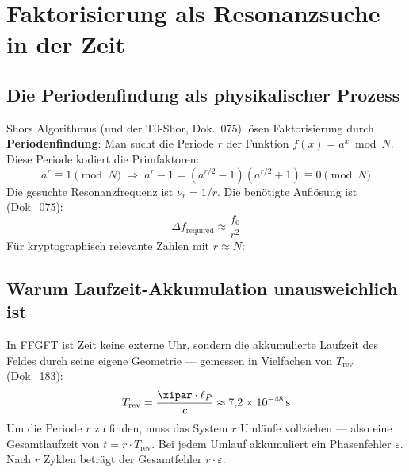 \section{Faktorisierung als Resonanzsuche in der Zeit}

\subsection{Die Periodenfindung als physikalischer Prozess}

Shors Algorithmus (und der T0-Shor, Dok.~075) lösen Faktorisierung durch
\textbf{Periodenfindung}: Man sucht die Periode $r$ der Funktion
$f(x) = a^x \bmod N$. Diese Periode kodiert die Primfaktoren:
\begin{equation}
    a^r \equiv 1 \pmod{N}
    \;\Rightarrow\;
    a^r - 1 = (a^{r/2} - 1)(a^{r/2} + 1) \equiv 0 \pmod{N}
\end{equation}
Die gesuchte Resonanzfrequenz ist $\nu_r = 1/r$. Die benötigte Auflösung ist
(Dok.~075):
\begin{equation}
    \Delta f_\text{required} \approx \frac{f_0}{r^2}
\end{equation}
Für kryptographisch relevante Zahlen mit $r \approx N$:

\begin{table}[ht]
\centering
{}
\caption{Präzisionsbarriere für Faktorisierung (nach Dok.~075)}
\end{table}

\subsection{Warum Laufzeit-Akkumulation unausweichlich ist}

In FFGFT ist Zeit keine externe Uhr, sondern die akkumulierte Laufzeit des Feldes
durch seine eigene Geometrie — gemessen in Vielfachen von $T_\text{rev}$ (Dok.~183):
\begin{equation}
    T_\text{rev} = \frac{\xipar \cdot \ell_P}{c} \approx 7{,}2 \times 10^{-48}\,\text{s}
\end{equation}
Um die Periode $r$ zu finden, muss das System $r$ Umläufe vollziehen — also eine
Gesamtlaufzeit von $t = r \cdot T_\text{rev}$. Bei jedem Umlauf akkumuliert ein
Phasenfehler $\varepsilon$. Nach $r$ Zyklen beträgt der Gesamtfehler $r \cdot \varepsilon$.

